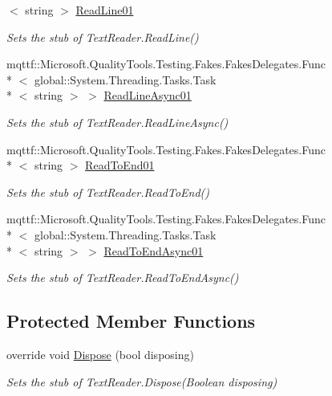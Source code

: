 \begin{DoxyCompactItemize}
$<$ string $>$ \hyperlink{class_system_1_1_i_o_1_1_fakes_1_1_stub_text_reader_aef676e62f83011951851972823f0e453}{Read\-Line01}
\begin{DoxyCompactList}\small\item\em Sets the stub of Text\-Reader.\-Read\-Line()\end{DoxyCompactList}\item 
mqttf\-::\-Microsoft.\-Quality\-Tools.\-Testing.\-Fakes.\-Fakes\-Delegates.\-Func\\*
$<$ global\-::\-System.\-Threading.\-Tasks.\-Task\\*
$<$ string $>$ $>$ \hyperlink{class_system_1_1_i_o_1_1_fakes_1_1_stub_text_reader_afff2ee6b6d83042e7b0fcac4f85ee8ae}{Read\-Line\-Async01}
\begin{DoxyCompactList}\small\item\em Sets the stub of Text\-Reader.\-Read\-Line\-Async()\end{DoxyCompactList}\item 
mqttf\-::\-Microsoft.\-Quality\-Tools.\-Testing.\-Fakes.\-Fakes\-Delegates.\-Func\\*
$<$ string $>$ \hyperlink{class_system_1_1_i_o_1_1_fakes_1_1_stub_text_reader_a0ea9412e4d05f6a7040d26d37a579081}{Read\-To\-End01}
\begin{DoxyCompactList}\small\item\em Sets the stub of Text\-Reader.\-Read\-To\-End()\end{DoxyCompactList}\item 
mqttf\-::\-Microsoft.\-Quality\-Tools.\-Testing.\-Fakes.\-Fakes\-Delegates.\-Func\\*
$<$ global\-::\-System.\-Threading.\-Tasks.\-Task\\*
$<$ string $>$ $>$ \hyperlink{class_system_1_1_i_o_1_1_fakes_1_1_stub_text_reader_aed9a2fa61a0d96dbf0d1226993abd549}{Read\-To\-End\-Async01}
\begin{DoxyCompactList}\small\item\em Sets the stub of Text\-Reader.\-Read\-To\-End\-Async()\end{DoxyCompactList}\end{DoxyCompactItemize}
\subsection*{Protected Member Functions}
\begin{DoxyCompactItemize}
\item 
override void \hyperlink{class_system_1_1_i_o_1_1_fakes_1_1_stub_text_reader_a57471511d4bb470db4b25aa95de31b0b}{Dispose} (bool disposing)
\begin{DoxyCompactList}\small\item\em Sets the stub of Text\-Reader.\-Dispose(\-Boolean disposing)\end{DoxyCompactList}\end{DoxyCompactItemize}
